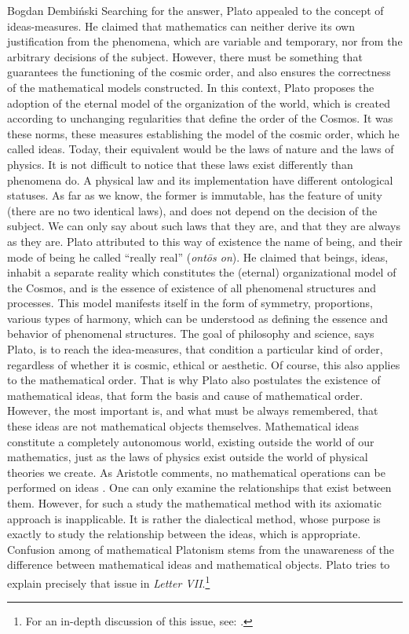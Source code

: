 \begin{artengenv}{Bogdan Dembiński}
Searching for the answer, Plato appealed to the concept of ideas-measures. He claimed that mathematics can neither
derive its own justification from the phenomena, which are variable and temporary, nor from the arbitrary decisions of
the subject. However, there must be something that guarantees the functioning of the cosmic order, and also ensures the
correctness of the mathematical models constructed. In this context, Plato proposes the %
adoption of the eternal model of the organization of the world, which is created according to unchanging regularities
that define the order of the Cosmos. It was these norms, these measures establishing the model of the cosmic order,
which he called ideas. Today, their equivalent would be the laws of nature and the laws of physics. It is not difficult
to notice that these laws exist differently than phenomena do. A physical law and its implementation have different
ontological statuses. As far as we know, the former is immutable, has the feature of unity (there are no two identical
laws), and does not depend on the decision of the subject. We can only say about such laws that they are, and that they
are always as they are. Plato attributed to this way of existence the name of being, and their mode of being he called
``really real'' (\textit{ont\=os on}). He claimed that beings, ideas, inhabit a separate
reality which constitutes the (eternal) organizational model of the Cosmos, and is the essence of existence of all
phenomenal structures and processes. This model manifests itself in the form of symmetry, proportions, various types of
harmony, which can be understood as defining the essence and behavior of phenomenal structures. The goal of philosophy
and science, says Plato, is to reach the idea-measures, that condition a particular kind of order, regardless of
whether it is cosmic, ethical or aesthetic. Of course, this also applies to the mathematical order. That is why Plato
also postulates the existence of mathematical ideas, that form the basis and cause of mathematical order. However, the
most important is, and what must be always remembered, that these ideas are not mathematical objects themselves.
Mathematical ideas constitute a completely autonomous world, existing outside the world of our mathematics, just as the
laws of physics exist outside the world of physical theories we create. As Aristotle comments, no mathematical
operations can be performed on ideas
\parencite[Metaphysica, 1081a]{aristotle_aristotles_1924}.
One can only
examine the relationships that exist between them. However, for such a study the mathematical method with its axiomatic
approach is inapplicable. It is rather the dialectical method, whose purpose is exactly to study the relationship
between the ideas, which is appropriate. Confusion among of mathematical Platonism stems from the unawareness of the
difference between mathematical ideas and mathematical objects. Plato tries to explain precisely that issue in
\textit{Letter VII}.\footnote{For an in-depth discussion of this issue, see:
\parencite[pp.55–110]{dembinski_pozna_2003}.
}


\end{artengenv}
